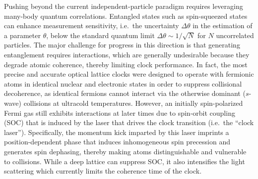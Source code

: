 \documentclass[aps,prx,superscriptaddress,notitlepage,twocolumn,longbibliography]{revtex4-2}
\begin{document}
Pushing beyond the current independent-particle paradigm requires leveraging many-body quantum correlations.
Entangled states such as spin-squeezed states\cite{kitagawa1993squeezed, wineland1992spin, ma2011quantum} can enhance measurement sensitivity, i.e.~the uncertainty $\Delta\theta$ in the estimation of a parameter $\theta$, below the standard quantum limit $\Delta\theta\sim1/\sqrt{N}$ for $N$ uncorrelated particles\cite{itano1993quantum, degen2017quantum}.
The major challenge for progress in this direction is that generating entanglement requires interactions, which are generally undesirable because they degrade atomic coherence, thereby limiting clock performance\cite{swallows2011suppression, martin2013quantum, rey2014probing, ludlow2011coldcollisionshift, lemke2011wave, ludlow2015optical}.
In fact, the most precise and accurate optical lattice clocks were designed to operate with fermionic atoms in identical nuclear and electronic states in order to suppress collisional decoherence\cite{campbell2009probing, swallows2011suppression, campbell2017fermidegenerate}, as identical fermions cannot interact via the otherwise dominant ($s$-wave) collisions at ultracold temperatures.
However, an initially spin-polarized Fermi gas still exhibits interactions at later times due to spin-orbit coupling (SOC) that is induced by the laser that drives the clock transition (i.e.~the ``clock laser'')\cite{wall2016synthetic, kolkowitz2016spinorbitcoupled, livi2016synthetic, bromley2018dynamics}.
Specifically, the momentum kick imparted by this laser imprints a position-dependent phase that induces inhomogeneous spin precession and generates spin dephasing, thereby making atoms distinguishable and vulnerable to collisions.
While a deep lattice can suppress SOC, it also intensifies the light scattering which currently limits the coherence time of the clock\cite{dorscher2018latticeinduced, goban2018emergence, hutson2019engineering}.
\end{document}
